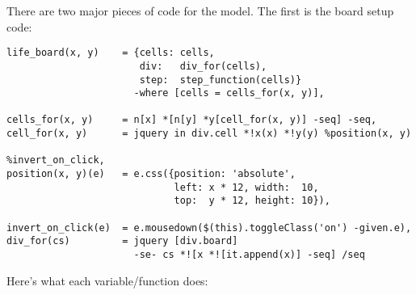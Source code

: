 \documentclass{report}
\begin{document}
      There are two major pieces of code for the model. The first is the board setup code:

\begin{verbatim}
life_board(x, y)    = {cells: cells,
                       div:   div_for(cells),
                       step:  step_function(cells)}
                      -where [cells = cells_for(x, y)],

cells_for(x, y)     = n[x] *[n[y] *y[cell_for(x, y)] -seq] -seq,
cell_for(x, y)      = jquery in div.cell *!x(x) *!y(y) %position(x, y)
                                                       %invert_on_click,
position(x, y)(e)   = e.css({position: 'absolute',
                             left: x * 12, width:  10,
                             top:  y * 12, height: 10}),

invert_on_click(e)  = e.mousedown($(this).toggleClass('on') -given.e),
div_for(cs)         = jquery [div.board]
                      -se- cs *![x *![it.append(x)] -seq] /seq
\end{verbatim}

      Here's what each variable/function does:
\end{document}
